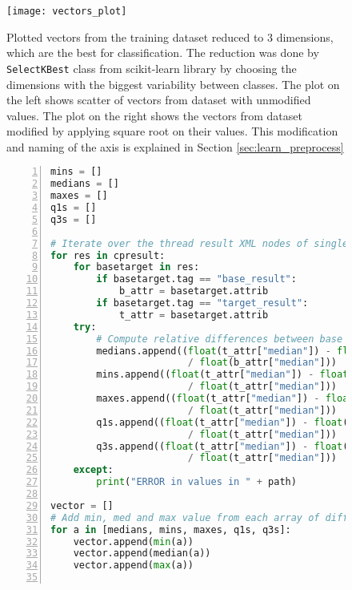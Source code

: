 \begin{figure}
  \centering
  \texttt{[image: vectors\_plot]}
  \caption{Plotted vectors from the training dataset reduced
    to 3 dimensions, which are the best for classification. The reduction was done by
    \texttt{SelectKBest} class from scikit-learn library by choosing the
    dimensions with the biggest variability between classes. The plot on the
    left shows scatter of vectors from dataset with unmodified values. The plot
    on the right shows the vectors from dataset modified by applying square root
    on their values. This modification and naming of the axis is explained in
    Section \ref{sec:learn_preprocess}}
  \label{fig:vectors_plot}
\end{figure}

\begin{figure}
  \small
  \begin{lstlisting}[language=Python, numbers=left]
mins = []
medians = []
maxes = []
q1s = []
q3s = []

# Iterate over the thread result XML nodes of single benchmark operation
for res in cpresult:
    for basetarget in res:
        if basetarget.tag == "base_result":
            b_attr = basetarget.attrib
        if basetarget.tag == "target_result":
            t_attr = basetarget.attrib
    try:
        # Compute relative differences between base and target results
        medians.append((float(t_attr["median"]) - float(b_attr["median"]))
                        / float(b_attr["median"]))
        mins.append((float(t_attr["median"]) - float(t_attr["min"]))
                        / float(t_attr["median"]))
        maxes.append((float(t_attr["median"]) - float(t_attr["max"]))
                        / float(t_attr["median"]))
        q1s.append((float(t_attr["median"]) - float(t_attr["first_q"]))
                        / float(t_attr["median"]))
        q3s.append((float(t_attr["median"]) - float(t_attr["third_q"]))
                        / float(t_attr["median"]))
    except:
        print("ERROR in values in " + path)

vector = []
# Add min, med and max value from each array of differences
for a in [medians, mins, maxes, q1s, q3s]:
    vector.append(min(a))
    vector.append(median(a))
    vector.append(max(a))


\end{lstlisting}
\end{figure}
